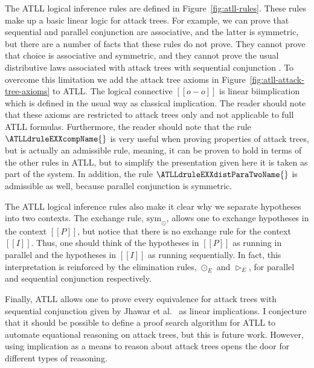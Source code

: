 The ATLL logical inference rules are defined in
Figure~\ref{fig:atll-rules}.  These rules make up a basic linear logic
for attack trees.  For example, we can prove that sequential and
parallel conjunction are associative, and the latter is symmetric, but
there are a number of facts that these rules do not prove.  They
cannot prove that choice is associative and symmetric, and they cannot
prove the usual distributive laws associated with attack trees with
sequential conjunction \cite{Jhawar:2015}.  To overcome this
limitation we add the attack tree axioms in
Figure~\ref{fig:atll-attack-tree-axioms} to ATLL.  The logical
connective $[[o-o]]$ is linear biimplication which is defined in the
usual way as classical implication.  The reader should note that these
axioms are restricted to attack trees only and not applicable to full
ATLL formulas.  Furthermore, the reader should note that the rule
$\ATLLdruleEXXcompName{}$ is very useful when proving properties of
attack trees, but is actually an admissible rule, meaning, it can be
proven to hold in terms of the other rules in ATLL, but to simplify
the presentation given here it is taken as part of the system.  In
addition, the rule $\ATLLdruleEXXdistParaTwoName{}$ is admissible as
well, because parallel conjunction is symmetric.

The ATLL logical inference rules also make it clear why we separate
hypotheses into two contexts.  The exchange rule, $\text{sym}_\odot$,
allows one to exchange hypotheses in the context $[[P]]$, but notice
that there is no exchange rule for the context $[[I]]$.  Thus, one
should think of the hypotheses in $[[P]]$ as running in parallel and
the hypotheses in $[[I]]$ as running sequentially.  In fact, this
interpretation is reinforced by the elimination rules, $\odot_E$ and
$\rhd_E$, for parallel and sequential conjunction respectively.

Finally, ATLL allows one to prove every equivalence for attack trees
with sequential conjunction given by Jhawar et al.~\cite{Jhawar:2015}
as linear implications.  I conjecture that it should be possible to
define a proof search algorithm for ATLL to automate equational
reasoning on attack trees, but this is future work.  However, using
implication as a means to reason about attack trees opens the door for
different types of reasoning.

